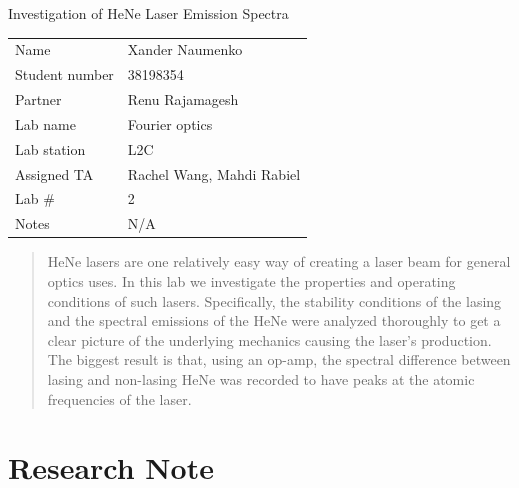 \documentclass[letterpaper, reqno,11pt]{article}
\begin{document}
\begin{titlepage}
\centering


\Large Investigation of HeNe Laser Emission Spectra

\normalsize




\begin{tabular}{ll}
Name & Xander Naumenko \\[2ex]
Student number & 38198354 \\[2ex]
Partner & Renu Rajamagesh \\[2ex]
Lab name & Fourier optics \\[2ex]
Lab station  & L2C \\[2ex]
Assigned TA            & Rachel Wang, Mahdi Rabiel \\[2ex]
Lab \#            & 2 \\[2ex]
Notes &  N/A
\end{tabular}


\begin{abstract}
    HeNe lasers are one relatively easy way of creating a laser beam for general optics uses. In this lab we investigate the properties and operating conditions of such lasers. Specifically, the stability conditions of the lasing and the spectral emissions of the HeNe were analyzed thoroughly to get a clear picture of the underlying mechanics causing the laser's production. The biggest result is that, using an op-amp, the spectral difference between lasing and non-lasing HeNe was recorded to have peaks at the atomic frequencies of the laser.
\end{abstract}

\end{titlepage}

\newpage

\section{Research Note}
\end{document}
